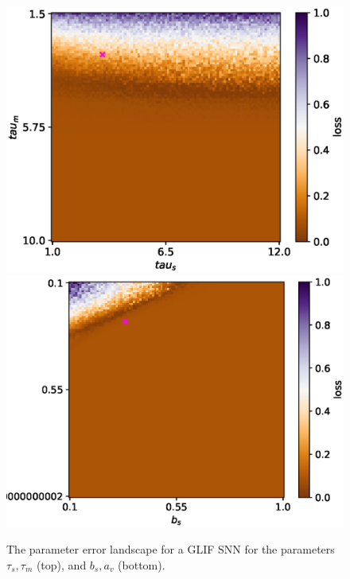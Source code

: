 \documentclass[mphil,deptreport,ianc]{infthesis} %
\begin{document}
\begin{figure}
    \centering
    \vskip -0.1in
    \includegraphics[width=0.7\columnwidth]{figures/param_landscape_heatmaps/GLIF/test_export_2d_heatmap_N_4_loss_tau_s_tau_m.eps}
    \includegraphics[width=0.7\columnwidth]{figures/param_landscape_heatmaps/GLIF/test_export_2d_heatmap_N_4_loss_b_s_a_v.eps}
    \vskip -0.1in
    \caption{The parameter error landscape for a GLIF SNN for the parameters $\tau_s, \tau_m$ (top), and $b_s, a_v$ (bottom).}
    \label{fig:p_landscape_hmap_GLIF}
\end{figure}
\end{document}
